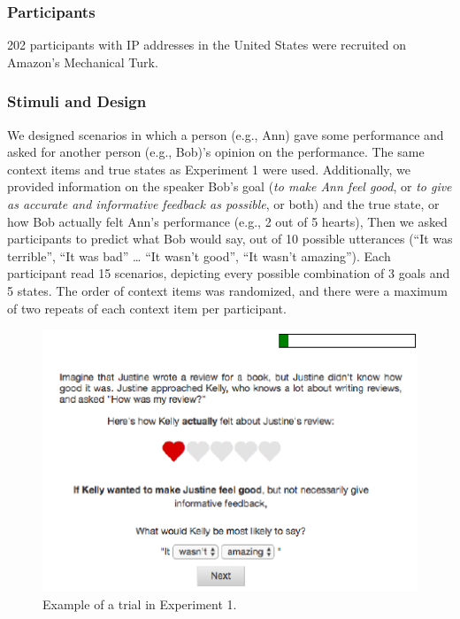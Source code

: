 \documentclass[10pt, letterpaper]{article}
\newenvironment{CodeChunk}{}{}
\begin{document}
\subsubsection{Participants}\label{participants}

202 participants with IP addresses in the United States were recruited
on Amazon's Mechanical Turk.

\subsubsection{Stimuli and Design}\label{stimuli-and-design}

We designed scenarios in which a person (e.g., Ann) gave some
performance and asked for another person (e.g., Bob)'s opinion on the
performance. The same context items and true states as Experiment 1 were
used. Additionally, we provided information on the speaker Bob's goal
(\emph{to make Ann feel good}, or \emph{to give as accurate and
informative feedback as possible}, or both) and the true state, or how
Bob actually felt Ann's performance (e.g., 2 out of 5 hearts), Then we
asked participants to predict what Bob would say, out of 10 possible
utterances (``It was terrible'', ``It was bad'' \ldots{} ``It wasn't
good'', ``It wasn't amazing''). Each participant read 15 scenarios,
depicting every possible combination of 3 goals and 5 states. The order
of context items was randomized, and there were a maximum of two repeats
of each context item per participant.

\begin{CodeChunk}
\captionsetup{width=0.8\textwidth}\begin{figure}[H]

{\centering \includegraphics{figs/expt2_screen-1} 

}

\caption[Example of a trial in Experiment 1]{Example of a trial in Experiment 1.}\label{fig:expt2_screen}
\end{figure}
\end{CodeChunk}
\end{document}
